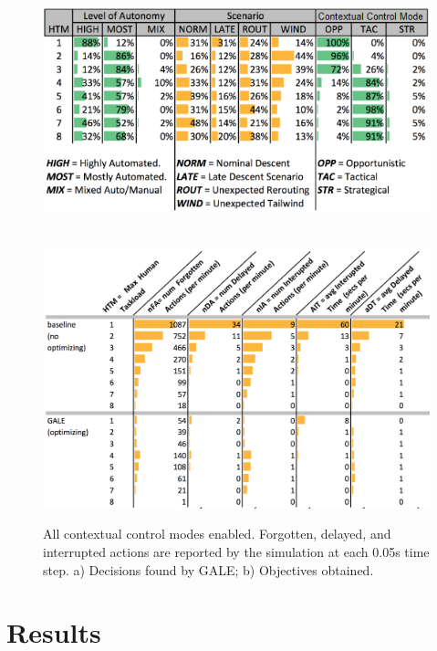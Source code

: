 \documentclass[journal]{IEEEtran}
\begin{document}
\begin{figure}
\begin{center}

\includegraphics[width=4.5in]{figures/GALE,decisions,Opp}
 
~\\

\includegraphics[width=5.25in]{figures/objectives,Opp}
 
\end{center}
\caption{  All contextual control modes enabled. 
Forgotten, delayed, and interrupted actions are reported by the simulation at each 0.05s time step.  
a) Decisions found by GALE; b) Objectives obtained. }\label{fig:all}
\end{figure}

\section{Results}
\end{document}
